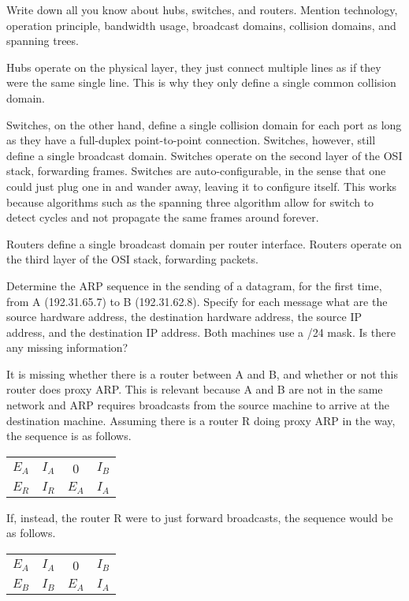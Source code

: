 \documentclass[12pt, oneside]{book}
\begin{document}
\begin{Exercise}
Write down all you know about hubs, switches, and routers.
Mention technology, operation principle, bandwidth usage, broadcast domains, collision domains, and spanning trees.
\end{Exercise}
\begin{Answer}
Hubs operate on the physical layer, they just connect multiple lines as if they were the same single line. This is why they only define a single common collision domain.

Switches, on the other hand, define a single collision domain for each port as long as they have a full-duplex point-to-point connection. Switches, however, still define a single broadcast domain.
Switches operate on the second layer of the OSI stack, forwarding frames.
Switches are auto-configurable, in the sense that one could just plug one in and wander away, leaving it to configure itself. This works because algorithms such as the spanning three algorithm allow for switch to detect cycles and not propagate the same frames around forever.

Routers define a single broadcast domain per router interface. Routers operate on the third layer of the OSI stack, forwarding packets.
\end{Answer}

\begin{Exercise}
Determine the ARP sequence in the sending of a datagram, for the first time, from A (192.31.65.7) to B (192.31.62.8).
Specify for each message what are the source hardware address, the destination hardware address, the source IP address, and the destination IP address.
Both machines use a /24 mask. Is there any missing information?
\end{Exercise}
\begin{Answer}
It is missing whether there is a router between A and B, and whether or not this router does proxy ARP.
This is relevant because A and B are not in the same network and ARP requires broadcasts from the source machine to arrive at the destination machine.
Assuming there is a router R doing proxy ARP in the way, the sequence is as follows.

\begin{center}
\begin{tabular}{c|c|c|c}
    \(E_A\) & \(I_A\) &       0 & \(I_B\) \\
    \(E_R\) & \(I_R\) & \(E_A\) & \(I_A\) \\
\end{tabular}
\end{center}

If, instead, the router R were to just forward broadcasts, the sequence would be as follows.

\begin{center}
\begin{tabular}{c|c|c|c}
    \(E_A\) & \(I_A\) &       0 & \(I_B\) \\
    \(E_B\) & \(I_B\) & \(E_A\) & \(I_A\) \\
\end{tabular}
\end{center}
\end{Answer}
\end{document}
